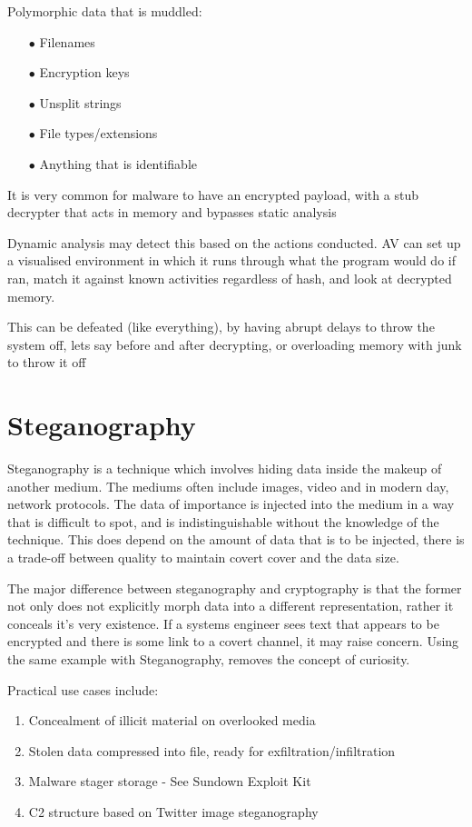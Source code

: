 Polymorphic data that is muddled:
\begin{enumerate}
    \item [$\bullet$]Filenames
    \item [$\bullet$]Encryption keys
    \item [$\bullet$]Unsplit strings
    \item [$\bullet$]File types/extensions
    \item [$\bullet$]Anything that is identifiable
\end{enumerate}

It is very common for malware to have an encrypted payload, with a stub decrypter that acts in memory and bypasses static analysis

Dynamic analysis may detect this based on the actions conducted. AV can set up a visualised environment in which it runs through what the program would do if ran, match it against 
known activities regardless of hash, and look at decrypted memory.

This can be defeated (like everything), by having abrupt delays to throw the system off, lets say before and after decrypting, or overloading memory with junk to throw it off

\section{Steganography}
Steganography is a technique which involves hiding data inside the makeup of another medium. The mediums often include images, video and in modern day, network protocols. \citep{NetStego}
The data of importance is injected into the medium in a way that is difficult to spot, and is indistinguishable without the knowledge of the technique. This does depend on the amount of data that is to be injected, there is a trade-off between quality to maintain covert cover and the data size.

The major difference between steganography and cryptography is that the former not only does not explicitly morph data into a different representation, rather it conceals it's very existence. If a systems engineer sees text that appears to be encrypted and there is some link to a covert channel, it may raise concern. Using the same example with Steganography,
removes the concept of curiosity. \citep{NetStego}

Practical use cases include:
\begin{enumerate}
    \item Concealment of illicit material on overlooked media
    \item Stolen data compressed into file, ready for exfiltration/infiltration
    \item Malware stager storage - See Sundown Exploit Kit
    \item C2 structure based on Twitter image steganography 
\end{enumerate}

